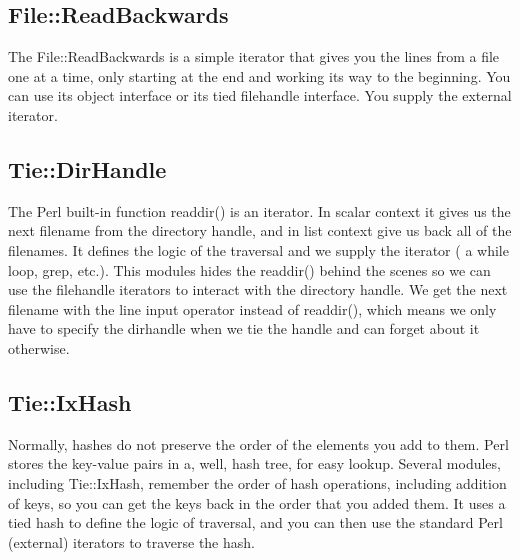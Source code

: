     \subsection{File::ReadBackwards}

The File::ReadBackwards is a simple iterator that gives you the lines
from a file one at a time, only starting at the end and working its
way to the beginning. You can use its object interface or its tied
filehandle interface.  You supply the external iterator.

    \subsection{Tie::DirHandle}

The Perl built-in function readdir() is an iterator. In scalar context
it gives us the next filename from the directory handle, and in list
context give us back all of the filenames.  It defines the logic of
the traversal and we supply the iterator ( a while loop, grep, etc.).
This modules hides the readdir() behind the scenes so we can use the
filehandle iterators to interact with the directory handle.  We get
the next filename with the line input operator instead of readdir(),
which means we only have to specify the dirhandle when we tie the
handle and can forget about it otherwise.
    
    \subsection{Tie::IxHash}

Normally, hashes do not preserve the order of the elements you add to
them.  Perl stores the key-value pairs in a, well, hash tree, for easy
lookup. Several modules, including Tie::IxHash, remember the order of
hash operations, including addition of keys, so you can get the keys
back in the order that you added them.  It uses a tied hash to define
the logic of traversal, and you can then use the standard Perl (external)
iterators to traverse the hash.
